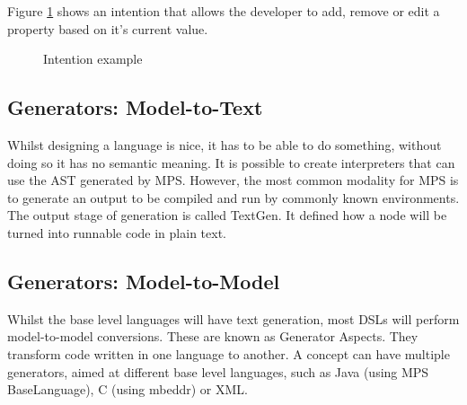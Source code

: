 Figure \ref{fig:intention_example} shows an intention that allows the developer to add, remove or edit a property based on it's current value.
\begin{figure}[h]
    \centering
    \caption{Intention example}
    \label{fig:intention_example}
\end{figure}

\subsection{Generators: Model-to-Text}
Whilst designing a language is nice, it has to be able to do something, without doing so it has no semantic meaning.
It is possible to create interpreters that can use the AST generated by MPS.
However, the most common modality for MPS is to generate an output to be compiled and run by commonly known environments.
The output stage of generation is called TextGen.
It defined how a node will be turned into runnable code in plain text.

\subsection{Generators: Model-to-Model}
Whilst the base level languages will have text generation, most DSLs will perform model-to-model conversions.
These are known as Generator Aspects.
They transform code written in one language to another.
A concept can have multiple generators, aimed at different base level languages, such as Java (using MPS BaseLanguage), C (using mbeddr) or XML.